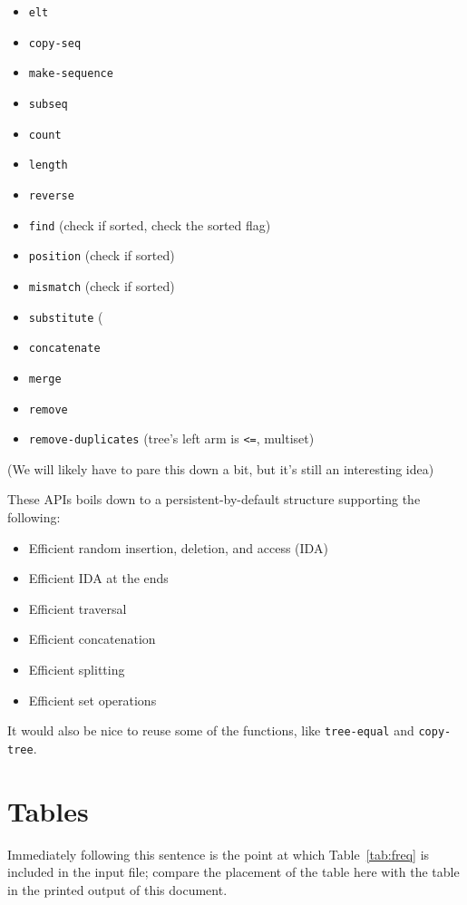 \documentclass[sigconf]{acmart}
\begin{document}
\begin{itemize}
    \item \texttt{elt}
    \item \texttt{copy-seq}
    \item \texttt{make-sequence}
    \item \texttt{subseq}
    \item \texttt{count}
    \item \texttt{length}
    \item \texttt{reverse}
    \item \texttt{find} (check if sorted, check the sorted flag)
    \item \texttt{position} (check if sorted)
    \item \texttt{mismatch} (check if sorted)
    \item \texttt{substitute} (
    \item \texttt{concatenate}
    \item \texttt{merge}
    \item \texttt{remove}
    \item \texttt{remove-duplicates} (tree's left arm is \texttt{<=}, multiset)
\end{itemize}

(We will likely have to pare this down a bit, but it's still an interesting
idea)

These APIs boils down to a persistent-by-default structure supporting the following:

\begin{itemize}
    \item Efficient random insertion, deletion, and access (IDA)
    \item Efficient IDA at the ends
    \item Efficient traversal
    \item Efficient concatenation
    \item Efficient splitting
    \item Efficient set operations
\end{itemize}

It would also be nice to reuse some of the functions, like \texttt{tree-equal} and
\texttt{copy-tree}.


\section{Tables}


Immediately following this sentence is the point at which
Table~\ref{tab:freq} is included in the input file; compare the
placement of the table here with the table in the printed output of
this document.
\end{document}
